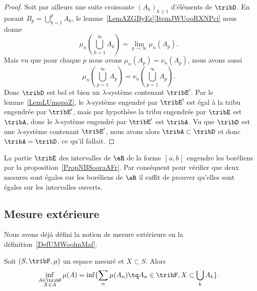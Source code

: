 \begin{proof}
    Soit par ailleurs une suite croissante \( (A_k)_{k\geq 1}\) d'éléments de \( \tribD\). En posant \( B_p=\bigcup_{k=1}^pA_k\), le lemme~\ref{LemAZGByEs}\ref{ItemJWUooRXNPci} nous donne
    \begin{equation}
        \mu_n(\bigcup_{k=1}^{\infty}A_k)=\lim_{p\to \infty} \mu_n(A_p).
    \end{equation}
    Mais vu que pour chaque \( p\) nous avons \( \mu_n(A_p)=\nu_n(A_p)\), nous avons aussi
    \begin{equation}
        \mu_n(\bigcup_{p=1}^{\infty}A_p)=\nu_n(\bigcup_{p=1}^{\infty}A_p).
    \end{equation}
    Donc \( \tribD\) est bel et bien un \( \lambda\)-système contenant \( \tribE'\). Par le lemme~\ref{LemLUmopaZ}, le \( \lambda\)-système engendré par \( \tribE'\) est égal à la tribu engendrée par \( \tribE'\), mais par hypothèse la tribu engendrée par \( \tribE\) est \( \tribA\), donc le \( \lambda\)-système engendré par \( \tribE'\) est \( \tribA\). Vu que \( \tribD\) est une \( \lambda\)-système contenant \( \tribE'\), nous avons alors \( \tribA\subset\tribD\) et donc \( \tribA=\tribD\), ce qu'il fallait.
\end{proof}

\begin{example}\label{ExDMPoohtNAj}
    La partie \( \tribE\) des intervalles de \( \eR\) de la forme \( \mathopen] a , b \mathclose[\) engendre les boréliens par la proposition~\ref{PropNBSooraAFr}. Par conséquent pour vérifier que deux mesures sont égales sur les boréliens de \( \eR\) il suffit de prouver qu'elles sont égales sur les intervalles ouverts.
\end{example}

\subsection{Mesure extérieure}

Nous avons déjà défini la notion de mesure extérieure en la définition~\ref{DefUMWoolmMaf}.

\begin{lemma}  \label{LemULSooBgZLI}
    Soit \( (S,\tribF,\mu)\) un espace mesuré et \( X\subset S\). Alors
    \begin{equation}
        \inf_{\substack{A\in\tribF\\X\in A}}\mu(A)=\inf\{ \sum_n\mu(A_n)\tq A_n\in\tribF,X\subset\bigcup_kA_k \}.
    \end{equation}
\end{lemma}

